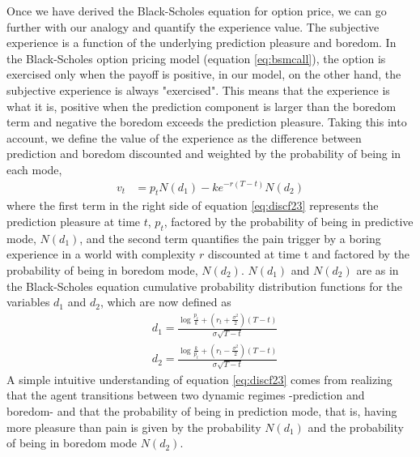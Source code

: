 \documentclass[11pt,twocolumn]{article}
\begin{document}
Once we have derived the Black-Scholes equation for option price, we can go further with our analogy and quantify the experience value. The subjective experience is a function of the underlying prediction pleasure and boredom. In the Black-Scholes option pricing model (equation \ref{eq:bsmcall}), the option is exercised only when the payoff is positive, in our model, on the other hand, the subjective experience is always "exercised". This means that the experience is what it is, positive when the prediction component is larger than the boredom term and negative the boredom exceeds the prediction pleasure. Taking this into account, we define the value of the experience as the difference between prediction and boredom discounted and weighted by the probability of being in each mode,
\begin{equation}
\begin{split}
    v_t  & =  p_{t}N(d_1) - k e^{-r(T-t)}N(d_2)
\end{split}
\label{eq:discf23}
\end{equation}
where the first term in the right side of equation \ref{eq:discf23} represents the prediction pleasure at time $t$, $p_{t}$, factored by the probability of being in predictive mode, $N(d_1)$, and the second term quantifies the pain trigger by a boring experience in a world with complexity $r$ discounted at time t and factored by the probability of being in boredom mode, $N(d_2)$. $N(d_1)$ and $N(d_2)$ are as in the Black-Scholes equation cumulative probability distribution functions for the variables $d_1$ and $d_2$, which are now defined as 
\begin{equation}
\begin{split}
    & d_1 = \frac{\log \frac{p_t}{k}  + (r_t + \frac{\sigma ^2}{2})(T-t)}{\sigma \sqrt{T-t}}  \\
    & d_2 = \frac{\log \frac{k}{p_t}  + (r_t - \frac{\sigma ^2}{2})(T-t)}{\sigma \sqrt{T-t}} 
\end{split}
\label{eq:discd1d2}
\end{equation}
A simple intuitive understanding of equation \ref{eq:discf23} comes from realizing that the agent transitions between two dynamic regimes -prediction and boredom- and that the probability of being in prediction mode, that is, having more pleasure than pain is given by the probability $N(d_1)$ and the probability of being in boredom mode $N(d_2)$.
\end{document}
